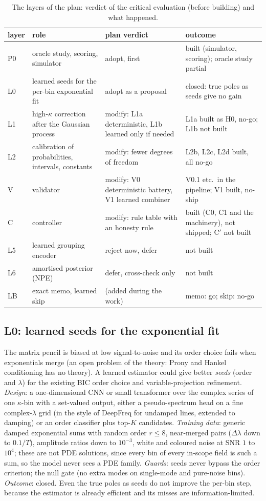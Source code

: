 \documentclass[11pt]{article}
\theoremstyle{plain}
\theoremstyle{definition}
\theoremstyle{remark}
\begin{document}
\begin{table}[tbp]
\centering\small
\caption{The layers of the plan: verdict of the critical evaluation (before building) and what happened.}\label{tab:plan}
\begin{tabular}{@{}p{1.5cm}p{4.2cm}p{3.1cm}p{3.1cm}@{}}
\toprule
layer & role & plan verdict & outcome\\
\midrule
P0 & oracle study, scoring, simulator & adopt, first & built (simulator, scoring); oracle study partial\\
L0 & learned seeds for the per-bin exponential fit & adopt as a proposal & closed: true poles as seeds give no gain\\
L1 & high-$\kappa$ correction after the Gaussian process & modify: L1a deterministic, L1b learned only if needed & L1a built as H0, no-go; L1b not built\\
L2 & calibration of probabilities, intervals, constants & modify: fewer degrees of freedom & L2b, L2c, L2d built, all no-go\\
V & validator & modify: V0 deterministic battery, V1 learned combiner & V0.1 etc.\ in the pipeline; V1 built, no-ship\\
C & controller & modify: rule table with an honesty rule & built (C0, C1 and the machinery), not shipped; C$'$ not built\\
L5 & learned grouping encoder & reject now, defer & not built\\
L6 & amortised posterior (NPE) & defer, cross-check only & not built\\
LB & exact memo, learned skip & (added during the work) & memo: go; skip: no-go\\
\bottomrule
\end{tabular}
\end{table}

\subsection{L0: learned seeds for the exponential fit}
The matrix pencil is biased at low signal-to-noise and its order choice fails when exponentials merge (an open problem of the theory: Prony and Hankel conditioning has no theory). A learned estimator could give better \emph{seeds} (order and $\lambda$) for the existing BIC order choice and variable-projection refinement.
\emph{Design}: a one-dimensional CNN or small transformer over the complex series of one $\kappa$-bin with a set-valued output, either a pseudo-spectrum head on a fine complex-$\lambda$ grid (in the style of DeepFreq for undamped lines, extended to damping) or an order classifier plus top-$K$ candidates.
\emph{Training data}: generic damped exponential sums with random order $r\le8$, near-merged pairs ($\Delta\lambda$ down to $0.1/T$), amplitude ratios down to $10^{-3}$, white and coloured noise at SNR $1$ to $10^4$; these are not PDE solutions, since every bin of every in-scope field is such a sum, so the model never sees a PDE family.
\emph{Guards}: seeds never bypass the order criterion; the null gate (no extra modes on single-mode and pure-noise bins). \emph{Outcome}: closed. Even the true poles as seeds do not improve the per-bin step, because the estimator is already efficient and its misses are information-limited.
\end{document}
